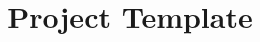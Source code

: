 \documentclass[12pt]{amsart}
\title{\AmSTeX Project Template}
\begin{document}

  
  \maketitle
  \tableofcontents
  \printnomenclature

\end{document}

